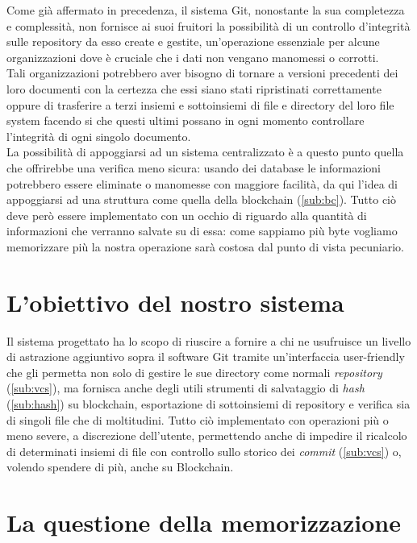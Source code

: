 
Come già affermato in precedenza, il sistema Git,
nonostante la sua completezza e complessità,
non fornisce ai suoi fruitori la possibilità di un controllo d’integrità
sulle repository da esso create e gestite, un’operazione essenziale per
alcune organizzazioni dove è cruciale che i dati non vengano manomessi o corrotti. \\
Tali organizzazioni potrebbero aver bisogno di tornare a versioni precedenti
dei loro documenti con la certezza che essi siano stati ripristinati
correttamente oppure di trasferire a terzi insiemi e sottoinsiemi
di file e directory del loro file system facendo si che questi ultimi
possano in ogni momento controllare l’integrità di ogni singolo documento. \\
La possibilità di appoggiarsi ad un sistema centralizzato è a questo punto quella
che offrirebbe una verifica meno sicura: usando dei database le informazioni
potrebbero essere eliminate o manomesse con maggiore facilità,
da qui l’idea di appoggiarsi ad una struttura come quella della blockchain (\autoref{sub:bc}).
Tutto ciò deve però essere implementato con un occhio di riguardo alla quantità
di informazioni che verranno salvate su di essa: come sappiamo più byte vogliamo
memorizzare più la nostra operazione sarà costosa dal punto di vista pecuniario.

\section{L’obiettivo del nostro sistema}

Il sistema progettato ha lo scopo di riuscire a fornire a chi ne usufruisce
un livello di astrazione aggiuntivo sopra il software Git tramite un’interfaccia
user-friendly che gli permetta non solo di gestire le sue directory come normali
\emph{repository} (\autoref{sub:vcs}), ma fornisca anche degli utili strumenti di
salvataggio di \emph{hash} (\autoref{sub:hash}) su blockchain, esportazione di sottoinsiemi di repository
e verifica sia di singoli file che di moltitudini.
Tutto ciò implementato con operazioni più o meno severe, a discrezione dell’utente,
permettendo anche di impedire il ricalcolo di determinati insiemi di file con controllo
sullo storico dei \emph{commit} (\autoref{sub:vcs}) o, volendo spendere di più, anche su Blockchain.

\section{La questione della memorizzazione}


